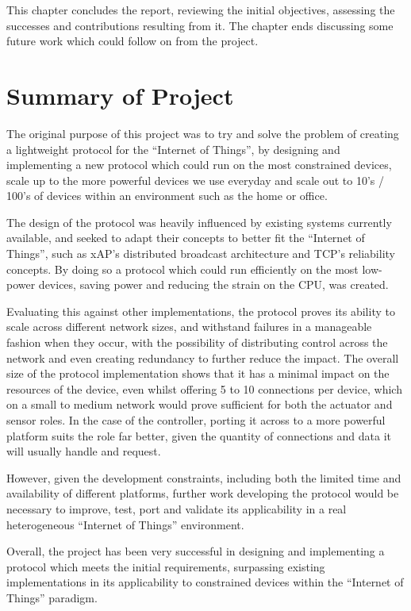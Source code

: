 This chapter concludes the report, reviewing the initial objectives, assessing the successes and contributions resulting from it.
The chapter ends discussing some future work which could follow on from the project.

\section{Summary of Project}
The original purpose of this project was to try and solve the problem of creating a lightweight protocol for the ``Internet of Things'', by designing and implementing a new protocol which could run on the most constrained devices, scale up to the more powerful devices we use everyday and scale out to 10's / 100's of devices within an environment such as the home or office.

The design of the protocol was heavily influenced by existing systems currently available, and seeked to adapt their concepts to better fit the ``Internet of Things'', such as xAP's distributed broadcast architecture and TCP's reliability concepts. By doing so a protocol which could run efficiently on the most low-power devices, saving power and reducing the strain on the CPU, was created.

Evaluating this against other implementations, the protocol proves its ability to scale across different network sizes, and withstand failures in a manageable fashion when they occur, with the possibility of distributing control across the network and even creating redundancy to further reduce the impact. The overall size of the protocol implementation shows that it has a minimal impact on the resources of the device, even whilst offering 5 to 10 connections per device, which on a small to medium network would prove sufficient for both the actuator and sensor roles. In the case of the controller, porting it across to a more powerful platform suits the role far better, given the quantity of connections and data it will usually handle and request.

However, given the development constraints, including both the limited time and availability of different platforms, further work developing the protocol would be necessary to improve, test, port and validate its applicability in a real heterogeneous ``Internet of Things'' environment.

Overall, the project has been very successful in designing and implementing a protocol which meets the initial requirements, surpassing existing implementations in its applicability to constrained devices within the ``Internet of Things'' paradigm.

